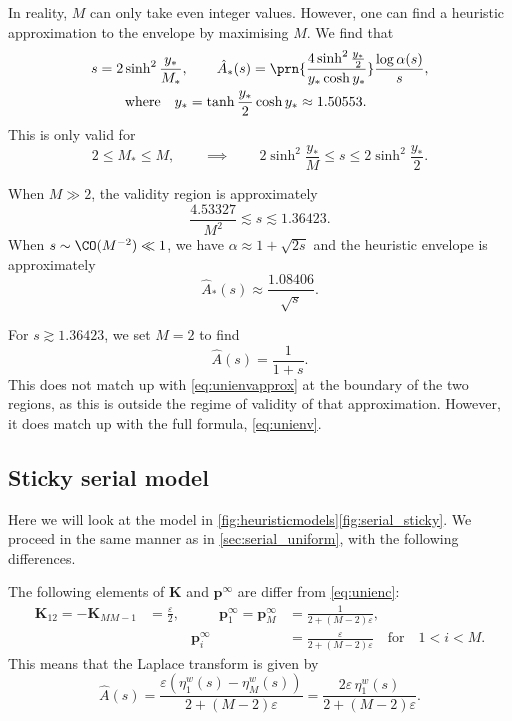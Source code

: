 \documentclass[12pt]{article}
\newcommand{\pr}{\mathbf{p}}
\newcommand{\eq}{\pr^\infty}
\newcommand{\enc}{\mathbf{K}}
\begin{document}
In reality, $M$ can only take even integer values.
However, one can find a heuristic approximation to the envelope by maximising \wrt $M$.
We find that
%
\begin{multline}\label{eq:unienv}
  s = 2\sinh^2\frac{y_*}{M_*},
  \qquad
  \hat{A}_*(s) = \prn{ \frac{ 4\sinh^2 \frac{y_*}{2} }{ y_* \cosh y_* } } \frac{\log\alpha(s)}{s},
  \\ \text{where}\quad 
  y_* = \tanh \frac{y_*}{2} \cosh y_* \approx 1.50553.
  \qquad
\end{multline}
%
This is only valid for
%
\begin{equation}\label{eq:univalid}
  2 \leq M_* \leq M,
  \qquad\implies\qquad
  2\sinh^2 \frac{y_*}{M} \leq s \leq 2\sinh^2 \frac{y_*}{2}.
\end{equation}
%

When $M \gg 2$, the validity region is approximately
%
\begin{equation}\label{eq:univalidapprox}
  \frac{4.53327}{M^2} \lesssim s \lesssim 1.36423.
\end{equation}
%
When $s \sim \CO(M^{-2}) \ll 1$, we have $\alpha \approx 1+\sqrt{2s}$ and the heuristic envelope is approximately
%
\begin{equation}\label{eq:unienvapprox}
  \hat{A}_*(s) \approx \frac{ 1.08406 }{ \sqrt{s} }.
\end{equation}
%

For $s\gtrsim 1.36423$, we set $M=2$ to find
%
\begin{equation}\label{eq:binaryenv}
  \hat{A}(s) = \frac{1}{1+s}.
\end{equation}
%
This does not match up with \eqref{eq:unienvapprox} at the boundary of the two regions, as this is outside the regime of validity of that approximation.
However, it does match up with the full formula, \eqref{eq:unienv}.



\subsection{Sticky serial model}\label{sec:serial_sticky}

Here we will look at the model in \autoref{fig:heuristicmodels}\ref{fig:serial_sticky}.
We proceed in the same manner as in \autoref{sec:serial_uniform}, with the following differences.

The following elements of $\enc$ and $\eq$ are differ from \eqref{eq:unienc}:
%
\begin{equation}\label{eq:stickyenc}
  \begin{aligned}
  \enc_{12} = -\enc_{MM-1} &= \frac{\varepsilon}{2},
  &\qquad
  \eq_1 = \eq_M &= \frac{1}{2+(M-2)\varepsilon},
  \\ &&
  \eq_i &=  \frac{\varepsilon}{2+(M-2)\varepsilon}
  \quad\text{for}\quad 1<i<M.
  \end{aligned}
\end{equation}
%
This means that the Laplace transform is given by
%
\begin{equation}\label{eq:stickyareaeta}
  \hat{A}(s) = \frac{\varepsilon(\eta^w_1(s)-\eta^w_M(s))}{2+(M-2)\varepsilon} 
       = \frac{2\varepsilon\, \eta^w_1(s)}{2+(M-2)\varepsilon}.
\end{equation}
%
\end{document}
